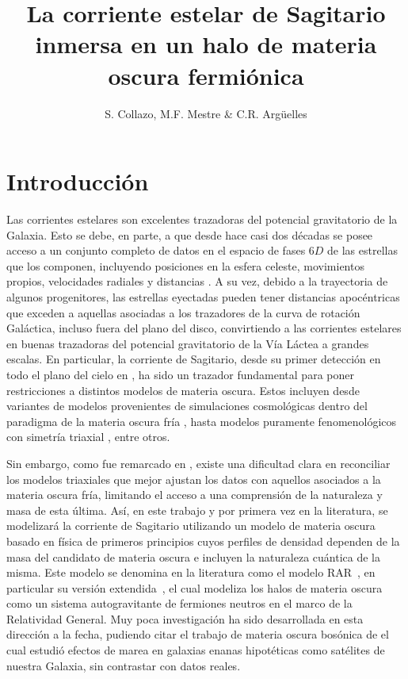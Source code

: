 \documentclass[baaa]{baaa}
\title{La corriente estelar de Sagitario inmersa en un halo de materia oscura fermiónica}
\author{S. Collazo\inst{1,2}, M.F. Mestre\inst{2} \& C.R. Argüelles\inst{2,3}
}
\institute{
Facultad de Ciencias Astronómicas y Geofísicas, UNLP, Argentina
\and
Instituto de Astrofísica de La Plata, CONICET--UNLP, Argentina
\and
International Center for Relativistic Astrophysics Network, Italia
}
\begin{document}
\maketitle

\section{Introducción}

Las corrientes estelares son excelentes trazadoras del potencial gravitatorio de la Galaxia. Esto se debe, en parte, a que desde hace casi dos décadas se posee acceso a un conjunto completo de datos en el espacio de fases $6D$ de las estrellas que los componen, incluyendo posiciones en la esfera celeste, movimientos propios, velocidades radiales y distancias \citep[ver e.g.][]{Ibata2020, Mateu2023}. A su vez, debido a la trayectoria de algunos progenitores, las estrellas eyectadas pueden tener distancias apocéntricas que exceden a aquellas asociadas a los trazadores de la curva de rotación Galáctica, incluso fuera del plano del disco, convirtiendo a las corrientes estelares en buenas trazadoras del potencial gravitatorio de la Vía Láctea a grandes escalas. En particular, la corriente de Sagitario, desde su primer detección en todo el plano del cielo en \cite{2003ApJ...599.1082M}, ha sido un trazador fundamental para poner restricciones a distintos modelos de materia oscura. Estos incluyen desde variantes de modelos provenientes de simulaciones cosmológicas dentro del paradigma de la materia oscura fría \citep{2005ApJ...619..807L}, hasta modelos puramente fenomenológicos con simetría triaxial \citep{Law2010}, entre otros.

Sin embargo, como fue remarcado en \cite{Law2010}, existe una dificultad clara en reconciliar los modelos triaxiales que mejor ajustan los datos con aquellos asociados a la materia oscura fría, limitando el acceso a una comprensión de la naturaleza y masa de esta última. Así, en este trabajo y por primera vez en la literatura, se modelizará la corriente de Sagitario utilizando un modelo de materia oscura basado en física de primeros principios cuyos perfiles de densidad dependen de la masa del candidato de materia oscura e incluyen la naturaleza cuántica de la misma. Este modelo se denomina en la literatura como el modelo RAR~\citep{Ruffini2015}, en particular su versión extendida~\citep{Arguelles2018, Arguelles2021}, el cual modeliza los halos de materia oscura como un sistema autogravitante de fermiones neutros en el marco de la Relatividad General. Muy poca investigación ha sido desarrollada en esta dirección a la fecha, pudiendo citar el trabajo de materia oscura bosónica de \cite{2015ApJ...810...99R} el cual estudió efectos de marea en galaxias enanas hipotéticas como satélites de nuestra Galaxia, sin contrastar con datos reales.
\end{document}
